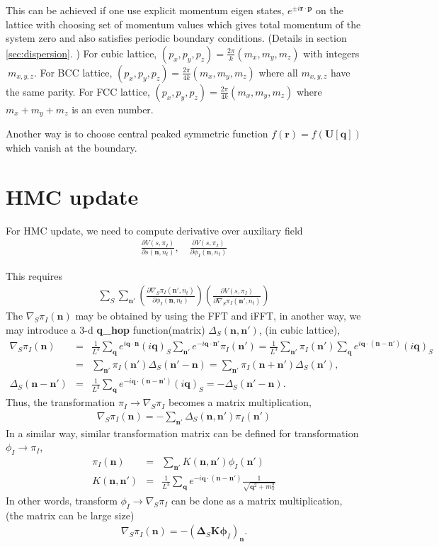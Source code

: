 \documentclass[10pt]{book}
\def\bm{\boldsymbol}
\newcommand{\bea}{\begin{eqnarray}}
\newcommand{\eea}{\end{eqnarray}}
\newcommand{\no}{\nonumber \\}
\newcommand{\del}{\partial}
\def\vn{{\bm n}}
\def\vq{{\bm q}}
\def\vr{{\bm r}}
\begin{document}
This can be achieved  if one use explicit momentum eigen states, 
$e^{\pm i {\bm r}\cdot {\bm p}}$ on the lattice
with choosing set of momentum values
which gives total momentum of the system zero and also 
satisfies periodic boundary conditions. (Details in section \ref{sec:dispersion}. )
For cubic lattice, $(p_x,p_y,p_z)=\frac{2\pi}{k}(m_x,m_y,m_z)$
with integers $\ m_{x,y,z}$.
For BCC lattice, $(p_x,p_y,p_z)=\frac{2\pi}{4k}(m_x,m_y,m_z)$ 
where all $m_{x,y,z}$ have the same parity. 
For FCC lattice,  $(p_x,p_y,p_z)=\frac{2\pi}{4k}(m_x,m_y,m_z)$ 
where $m_x+m_y+m_z$ is an even number.

Another way is to choose central peaked symmetric function 
$f(\vr)=f({\bm U}[\vq])$
which vanish at the boundary. 

\section{HMC update}

For HMC update, we need to compute derivative over auxiliary field
\bea 
\frac{\del V(s,\pi_I)}{\del s(\vn,n_t)},\quad  \frac{\del V(s,\pi_I)}{\del \phi_I(\vn,n_t)}
\eea 

This requires 
\bea 
\sum_{S} \sum_{\vn'} 
\left(\frac{\del \nabla_S \pi_I(\vn',n_t)}{\del \phi_I(\vn,n_t)}\right)
\left( \frac{\del V(s,\pi_I)}{\del \nabla_S \pi_I(\vn',n_t)}\right) 
\eea  
The $\nabla_S \pi_I(\vn)$  may be obtained by using the FFT and iFFT, 
in another way, we may introduce a 3-d {\bf q\_hop} function(matrix) $\Delta_S(\vn,\vn')$, (in cubic lattice),
\bea 
\nabla_S \pi_I(\vn) &=& \frac{1}{L^3}\sum_\vq e^{i\vq\cdot\vn}(i\vq)_S 
\sum_{\vn'} e^{-i\vq\cdot\vn'}\pi_I(\vn') 
=  \frac{1}{L^3}\sum_{\vn'} \pi_I(\vn') 
\sum_\vq e^{i\vq\cdot(\vn-\vn')}(i\vq)_S \no 
&=& \sum_{\vn'} \pi_I(\vn')\Delta_S(\vn'-\vn)=\sum_{\vn'} \pi_I(\vn+\vn')\Delta_S(\vn'),\no 
\Delta_S(\vn-\vn')&=&  \frac{1}{L^3} \sum_\vq e^{-i\vq\cdot(\vn-\vn')}(i\vq)_S 
=  -\Delta_S(\vn'-\vn).
\eea  
Thus, the transformation $\pi_I\to \nabla_S \pi_I$ becomes a matrix multiplication,
\bea 
\nabla_S \pi_I(\vn)= -\sum_{\vn'} \Delta_S(\vn,\vn')\pi_I(\vn')
\eea 
In a similar way, similar transformation matrix can be defined for transformation
$\phi_I\to \pi_I$, 
\bea 
\pi_I(\vn)&=&\sum_{\vn'} K(\vn,\vn') \phi_I(\vn')\no 
K(\vn,\vn')&=&\frac{1}{L^3}\sum_{\vq} e^{-i\vq\cdot(\vn-\vn')}\frac{1}{\sqrt{\vq^2+m_{\pi}^2}} 
\eea 
In other words, transform $\phi_I\to \nabla_S\pi_I$ can be done as a matrix multiplication,
(the matrix can be large size)
\bea 
\nabla_S\pi_{I}(\vn)=-\left({\bm \Delta_S} {\bm K} {\bm \phi}_I \right)_{\vn}. 
\eea 
\end{document}
